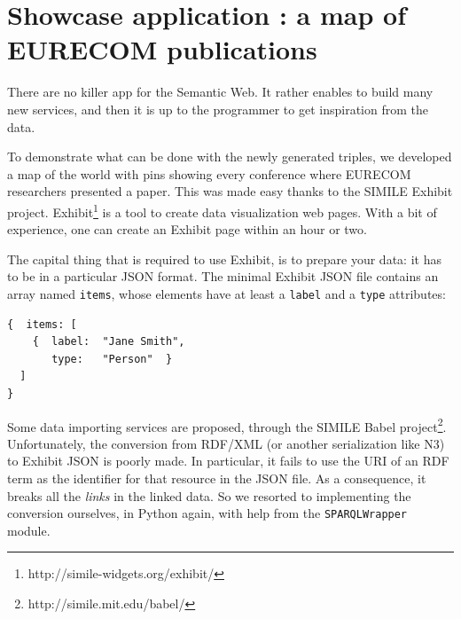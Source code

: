 \documentclass[a4paper,11pt]{report}
\begin{document}


\chapter{Showcase application : a map of \mbox{EURECOM} publications}
There are no killer app for the Semantic Web. It rather enables to build many new services, and then it is up to the programmer to get inspiration from the data.

To demonstrate what can be done with the newly generated triples, we developed a map of the world with pins showing every conference where \mbox{EURECOM} researchers presented a paper. This was made easy thanks to the SIMILE Exhibit project. Exhibit\footnote{http://simile-widgets.org/exhibit/} is a tool to create data visualization web pages. With a bit of experience, one can create an Exhibit page within an hour or two. 

The capital thing that is required to use Exhibit, is to prepare your data: it has to be in a particular JSON format. The minimal Exhibit JSON file contains an array named \texttt{items}, whose elements have at least a \texttt{label} and a \texttt{type} attributes:
\begin{Verbatim}[xleftmargin=3em]
{  items: [
    {  label:  "Jane Smith",
       type:   "Person"  }
  ]
}
\end{Verbatim}

Some data importing services are proposed, through the SIMILE Babel project\footnote{http://simile.mit.edu/babel/}. Unfortunately, the conversion from RDF/XML (or another serialization like N3) to Exhibit JSON is poorly made. In particular, it fails to use the URI of an RDF term as the identifier for that resource in the JSON file. As a consequence, it breaks all the \emph{links} in the linked data. So we resorted to implementing the conversion ourselves, in Python again, with help from the \texttt{SPARQLWrapper} module. 
\end{document}
